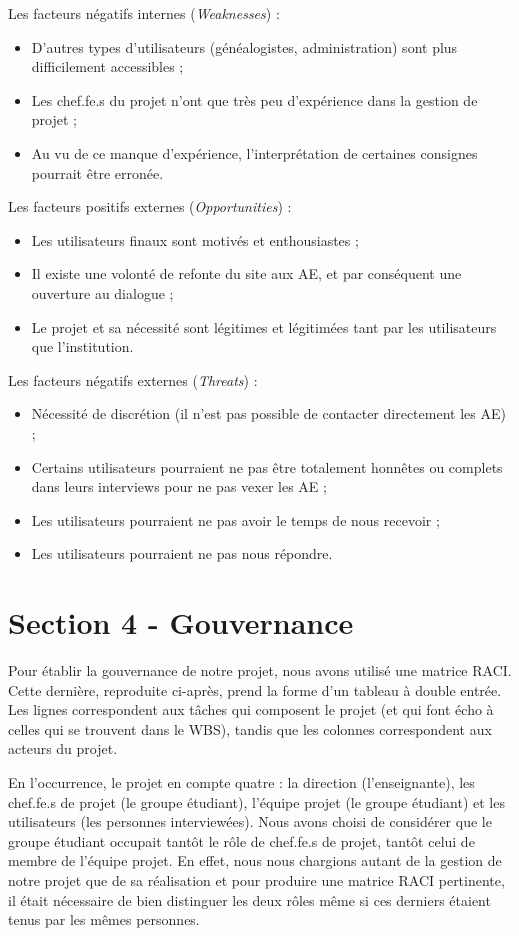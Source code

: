 \documentclass[a4paper,12pt]{article}
\begin{document}
Les facteurs négatifs internes (\textit{Weaknesses}) : 
\begin{itemize}
	\item D'autres types d'utilisateurs (généalogistes, administration) sont plus difficilement accessibles ;
	\item Les chef.fe.s du projet n'ont que très peu d'expérience dans la gestion de projet ;
	\item Au vu de ce manque d'expérience, l'interprétation de certaines consignes pourrait être erronée.
\end{itemize}

Les facteurs positifs externes (\textit{Opportunities}) : 
\begin{itemize}
	\item Les utilisateurs finaux sont motivés et enthousiastes ;
	\item Il existe une volonté de refonte du site aux AE, et par conséquent une ouverture au dialogue ;
	\item Le projet et sa nécessité sont légitimes et légitimées tant par les utilisateurs que l'institution.
\end{itemize}

Les facteurs négatifs externes (\textit{Threats}) : 
\begin{itemize}
	\item Nécessité de discrétion (il n'est pas possible de contacter directement les AE) ;
	\item Certains utilisateurs pourraient ne pas être totalement honnêtes ou complets dans leurs interviews pour ne pas vexer les AE ;
	\item Les utilisateurs pourraient ne pas avoir le temps de nous recevoir ;
	\item Les utilisateurs pourraient ne pas nous répondre.
\end{itemize}

\section{Section 4 - Gouvernance}

Pour établir la gouvernance de notre projet, nous avons utilisé une matrice RACI. Cette dernière, reproduite ci-après, prend la forme d'un tableau à double entrée. Les lignes correspondent aux tâches qui composent le projet (et qui font écho à celles qui se trouvent dans le WBS), tandis que les colonnes correspondent aux acteurs du projet.

En l'occurrence, le projet en compte quatre : la direction (l'enseignante), les chef.fe.s de projet (le groupe étudiant), l'équipe projet (le groupe étudiant) et les utilisateurs (les personnes interviewées). Nous avons choisi de considérer que le groupe étudiant occupait tantôt le rôle de chef.fe.s de projet, tantôt celui de membre de l'équipe projet. En effet, nous nous chargions autant de la gestion de notre projet que de sa réalisation et pour produire une matrice RACI pertinente, il était nécessaire de bien distinguer les deux rôles même si ces derniers étaient tenus par les mêmes personnes.
\end{document}
